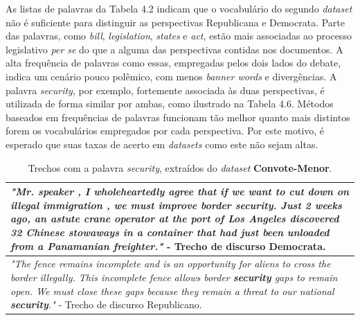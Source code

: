 

As listas de palavras da Tabela 4.2 indicam que o vocabulário do segundo \emph{dataset} não é suficiente para distinguir as perspectivas Republicana e Democrata. Parte das palavras, como \emph{bill}, \emph{legislation}, \emph{states} e \emph{act}, estão mais associadas ao processo legislativo \emph{per se} do que a alguma das perspectivas contidas nos documentos. A alta frequência de palavras como essas, empregadas pelos dois lados do debate, indica um cenário pouco polêmico, com menos \emph{banner words} e divergências. A palavra \emph{security}, por exemplo, fortemente associada às duas perspectivas, é utilizada de forma similar por ambas, como ilustrado na Tabela 4.6. Métodos baseados em frequências de palavras funcionam tão melhor quanto mais distintos forem os vocabulários empregados por cada perspectiva. Por este motivo, é esperado que suas taxas de acerto em \emph{datasets} como este não sejam altas.

\begin{table}[t]
\centering
\begin{tabular}{| p{10cm} | }
\hline

\emph{"Mr. speaker , I wholeheartedly agree that if we want to cut down on illegal immigration , we must improve border \textbf{security}. Just 2 weeks ago, an astute crane operator at the port of Los Angeles discovered 32 Chinese stowaways in a container that had just been unloaded from a Panamanian freighter."} - Trecho de discurso Democrata. \\ \hline


\emph{"The fence remains incomplete and is an opportunity for aliens to cross the border illegally. This incomplete fence allows border \textbf{security} gaps to remain open.  We must close these gaps because they remain a threat to our national \textbf{security}."} - Trecho de discurso Republicano. \\ \hline
\end{tabular}
\label{6}
\caption{Trechos com a palavra \emph{security}, extraídos do \emph{dataset} \textbf{Convote-Menor}.}
\end{table}



